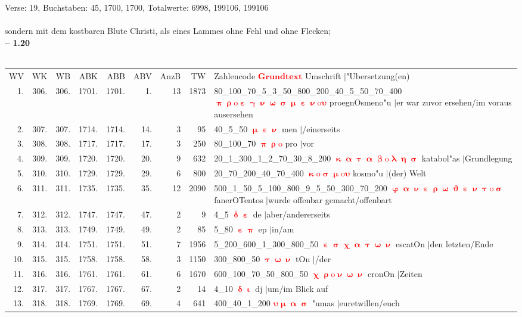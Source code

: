 \documentclass[a4paper,10pt,landscape]{article}
\begin{document}
Verse: 19, Buchstaben: 45, 1700, 1700, Totalwerte: 6998, 199106, 199106\\
\\
sondern mit dem kostbaren Blute Christi, als eines Lammes ohne Fehl und ohne Flecken;\\
\newpage 
{\bf -- 1.20}\\
\medskip \\
\begin{tabular}{rrrrrrrrp{120mm}}
WV&WK&WB&ABK&ABB&ABV&AnzB&TW&Zahlencode \textcolor{red}{$\boldsymbol{Grundtext}$} Umschrift $|$"Ubersetzung(en)\\
1.&306.&306.&1701.&1701.&1.&13&1873&80\_100\_70\_5\_3\_50\_800\_200\_40\_5\_50\_70\_400 \textcolor{red}{$\boldsymbol{\uppi\uprho\mathrm{o}\upepsilon\upgamma\upnu\upomega\upsigma\upmu\upepsilon\upnu\mathrm{o}\upsilon}$} proegnOsmeno"u $|$er war zuvor ersehen/im voraus ausersehen\\
2.&307.&307.&1714.&1714.&14.&3&95&40\_5\_50 \textcolor{red}{$\boldsymbol{\upmu\upepsilon\upnu}$} men $|$/einerseits\\
3.&308.&308.&1717.&1717.&17.&3&250&80\_100\_70 \textcolor{red}{$\boldsymbol{\uppi\uprho\mathrm{o}}$} pro $|$vor\\
4.&309.&309.&1720.&1720.&20.&9&632&20\_1\_300\_1\_2\_70\_30\_8\_200 \textcolor{red}{$\boldsymbol{\upkappa\upalpha\uptau\upalpha\upbeta\mathrm{o}\uplambda\upeta\upsigma}$} katabol"as $|$Grundlegung\\
5.&310.&310.&1729.&1729.&29.&6&800&20\_70\_200\_40\_70\_400 \textcolor{red}{$\boldsymbol{\upkappa\mathrm{o}\upsigma\upmu\mathrm{o}\upsilon}$} kosmo"u $|$(der) Welt\\
6.&311.&311.&1735.&1735.&35.&12&2090&500\_1\_50\_5\_100\_800\_9\_5\_50\_300\_70\_200 \textcolor{red}{$\boldsymbol{\upvarphi\upalpha\upnu\upepsilon\uprho\upomega\upvartheta\upepsilon\upnu\uptau\mathrm{o}\upsigma}$} fanerOTentos $|$wurde offenbar gemacht/offenbart\\
7.&312.&312.&1747.&1747.&47.&2&9&4\_5 \textcolor{red}{$\boldsymbol{\updelta\upepsilon}$} de $|$aber/andererseits\\
8.&313.&313.&1749.&1749.&49.&2&85&5\_80 \textcolor{red}{$\boldsymbol{\upepsilon\uppi}$} ep $|$in/am\\
9.&314.&314.&1751.&1751.&51.&7&1956&5\_200\_600\_1\_300\_800\_50 \textcolor{red}{$\boldsymbol{\upepsilon\upsigma\upchi\upalpha\uptau\upomega\upnu}$} escatOn $|$den letzten/Ende\\
10.&315.&315.&1758.&1758.&58.&3&1150&300\_800\_50 \textcolor{red}{$\boldsymbol{\uptau\upomega\upnu}$} tOn $|$/der\\
11.&316.&316.&1761.&1761.&61.&6&1670&600\_100\_70\_50\_800\_50 \textcolor{red}{$\boldsymbol{\upchi\uprho\mathrm{o}\upnu\upomega\upnu}$} cronOn $|$Zeiten\\
12.&317.&317.&1767.&1767.&67.&2&14&4\_10 \textcolor{red}{$\boldsymbol{\updelta\upiota}$} dj $|$um/im Blick auf\\
13.&318.&318.&1769.&1769.&69.&4&641&400\_40\_1\_200 \textcolor{red}{$\boldsymbol{\upsilon\upmu\upalpha\upsigma}$} "umas $|$euretwillen/euch\\
\end{tabular}\medskip \\
\end{document}
